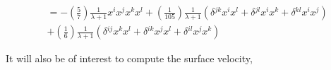 \begin{align*}
    &=
    -\left(\frac{5}{7}\right)\frac{1}{\lambda + 1}x{}^{i}x{}^{j}x{}^{k}x{}^{l} 
    +\left(\frac{1}{105}\right)\frac{1}{\lambda + 1}(\delta{}^{jk}x{}^{i}x{}^{l}+\delta{}^{jl}x{}^{i}x{}^{k}+\delta{}^{kl}x{}^{i}x{}^{j})\\ 
    &+\left(\frac{1}{6}\right)\frac{1}{\lambda + 1}(\delta{}^{ij}x{}^{k}x{}^{l} +\delta{}^{ik}x{}^{j}x{}^{l}+\delta{}^{il}x{}^{j}x{}^{k})
\end{align*}


It will also be of interest to compute the surface velocity, 
